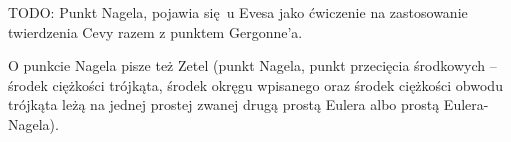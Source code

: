 %

TODO: Punkt Nagela, pojawia się u Evesa \cite[s. 71]{eves1_1972} jako ćwiczenie na zastosowanie twierdzenia Cevy razem z punktem Gergonne'a.

\begin{proposition}
    \label{punkt_nagela}
\end{proposition}

O punkcie Nagela pisze też Zetel \cite[s. 22, 25, 64]{zetel_2020} (punkt Nagela, punkt przecięcia środkowych -- środek ciężkości trójkąta, środek okręgu wpisanego oraz środek ciężkości obwodu trójkąta leżą na jednej prostej zwanej drugą prostą Eulera albo prostą Eulera-Nagela).

%